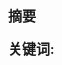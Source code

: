\setcounter{page}{1}
\pagestyle{artimain}

\begin{center}
\textbf{\heiti \titlethesisCHN}
\\[2em]
\textbf{\heiti 摘\quad 要}
\end{center}

\vspace{2em}\songti 
\vspace{2em}\par\textbf{\heiti 关键词: }